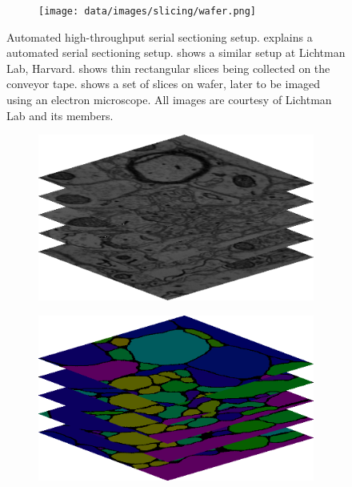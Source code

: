 \begin{figure}[htpb]
	\begin{subfigure}[b]{\mywidth}
		\centering
		\texttt{[image: data/images/slicing/wafer.png]}
		\caption{\label{fig:wafer}}
	\end{subfigure}
	\caption{Automated high-throughput serial sectioning setup.  explains a automated serial sectioning setup.  shows a similar setup at Lichtman Lab, Harvard.  shows thin rectangular slices being collected on the conveyor tape.  shows a set of slices on wafer, later to be imaged using an electron microscope. All images are courtesy of Lichtman Lab \cite{LichtmanLab} and its members.}
	\label{fig:emSlicing}
\end{figure}

\begin{figure}[htpb]
	\newcommand{\mywidth}{0.44\textwidth}
	\newcommand{\mywidthlarge}{0.66\textwidth}
	\centering
	\begin{subfigure}[b]{\mywidth}
		\centering
		\includegraphics[width=\textwidth]{data/images/stack/im.png}
		\caption{\label{fig:im_stack}}
	\end{subfigure}
	\hspace{3mm}
	\begin{subfigure}[b]{\mywidth}
		\centering
		\includegraphics[width=\textwidth]{data/images/stack/seg.png}

\end{subfigure}
\end{figure}
